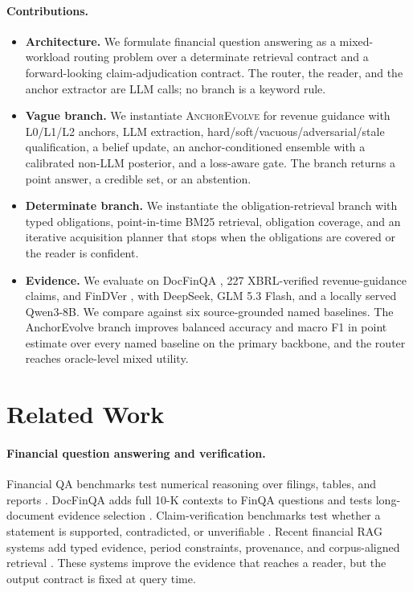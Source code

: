 \documentclass[11pt]{article}
\newcommand{\anchor}{\textsc{AnchorEvolve}}
\begin{document}
\paragraph{Contributions.}
\begin{itemize}[leftmargin=*,itemsep=1pt,topsep=2pt]
\item \textbf{Architecture.} We formulate financial question answering as a mixed-workload routing problem over a determinate retrieval contract and a forward-looking claim-adjudication contract. The router, the reader, and the anchor extractor are LLM calls; no branch is a keyword rule.
\item \textbf{Vague branch.} We instantiate \anchor{} for revenue guidance with L0/L1/L2 anchors, LLM extraction, hard/soft/vacuous/adversarial/stale qualification, a belief update, an anchor-conditioned ensemble with a calibrated non-LLM posterior, and a loss-aware gate. The branch returns a point answer, a credible set, or an abstention.
\item \textbf{Determinate branch.} We instantiate the obligation-retrieval branch with typed obligations, point-in-time BM25 retrieval, obligation coverage, and an iterative acquisition planner that stops when the obligations are covered or the reader is confident.
\item \textbf{Evidence.} We evaluate on DocFinQA \citep{reddy2024docfinqa}, 227 XBRL-verified revenue-guidance claims, and FinDVer \citep{zhao2024findver}, with DeepSeek, GLM 5.3 Flash, and a locally served Qwen3-8B. We compare against six source-grounded named baselines. The AnchorEvolve branch improves balanced accuracy and macro F1 in point estimate over every named baseline on the primary backbone, and the router reaches oracle-level mixed utility.
\end{itemize}

\section{Related Work}

\paragraph{Financial question answering and verification.}
Financial QA benchmarks test numerical reasoning over filings, tables, and reports \citep{chen2021finqa,zhu2021tatqa,islam2023financebench,liu2024finben}. DocFinQA adds full 10-K contexts to FinQA questions and tests long-document evidence selection \citep{reddy2024docfinqa}. Claim-verification benchmarks test whether a statement is supported, contradicted, or unverifiable \citep{zhao2024findver,rangapur2025finfact}. Recent financial RAG systems add typed evidence, period constraints, provenance, and corpus-aligned retrieval \citep{mansouri2026finrank,jiang2026finrate,chen2026hcrag,chi2026finsagent}. These systems improve the evidence that reaches a reader, but the output contract is fixed at query time.
\end{document}
